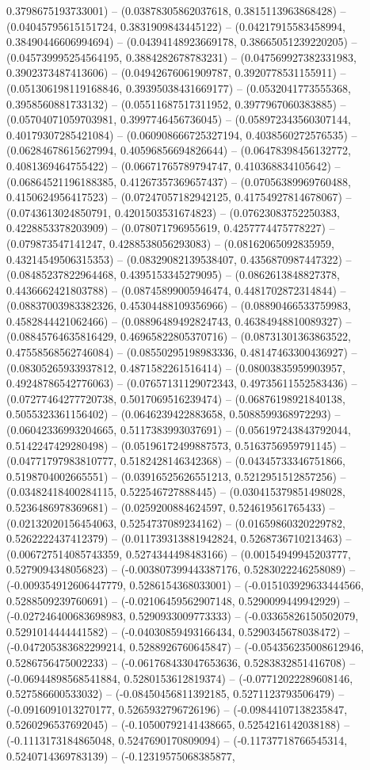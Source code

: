 0.3798675193733001) -- (0.03878305862037618, 0.3815113963868428) -- (0.04045795615151724, 0.3831909843445122) -- (0.04217915583458994, 0.38490446606994694) -- (0.04394148923669178, 0.38665051239220205) -- (0.045739995254564195, 0.3884282678783231) -- (0.047569927382331983, 0.3902373487413606) -- (0.04942676061909787, 0.3920778531155911) -- (0.051306198119168846, 0.39395038431669177) -- (0.0532041773555368, 0.3958560881733132) -- (0.05511687517311952, 0.3977967060383885) -- (0.05704071059703981, 0.3997746456736045) -- (0.058972343560307144, 0.40179307285421084) -- (0.060908666725327194, 0.4038560272576535) -- (0.06284678615627994, 0.40596856694826644) -- (0.06478398456132772, 0.4081369464755422) -- (0.06671765789794747, 0.410368834105642) -- (0.06864521196188385, 0.41267357369657437) -- (0.07056389969760488, 0.4150624956417523) -- (0.07247057182942125, 0.41754927814678067) -- (0.0743613024850791, 0.4201503531674823) -- (0.07623083752250383, 0.4228853378203909) -- (0.078071796955619, 0.4257774475778227) -- (0.079873547141247, 0.4288538056293083) -- (0.08162065092835959, 0.43214549506315353) -- (0.08329082139538407, 0.4356870987447322) -- (0.08485237822964468, 0.4395153345279095) -- (0.0862613848827378, 0.4436662421803788) -- (0.08745899005946474, 0.4481702872314844) -- (0.08837003983382326, 0.45304488109356966) -- (0.08890466533759983, 0.4582844421062466) -- (0.08896489492824743, 0.46384948810089327) -- (0.08845764635816429, 0.46965822805370716) -- (0.08731301363863522, 0.47558568562746084) -- (0.08550295198983336, 0.48147463300436927) -- (0.08305265933937812, 0.4871582261516414) -- (0.08003835959903957, 0.49248786542776063) -- (0.07657131129072343, 0.49735611552583436) -- (0.07277464277720738, 0.5017069516239474) -- (0.06876198921840138, 0.5055323361156402) -- (0.0646239422883658, 0.5088599368972293) -- (0.06042336993204665, 0.5117383993037691) -- (0.056197243843792044, 0.5142247429280498) -- (0.05196172499887573, 0.5163756959791145) -- (0.04771797983810777, 0.5182428146342368) -- (0.04345733346751866, 0.5198704002665551) -- (0.03916525626551213, 0.5212951512857256) -- (0.03482418400284115, 0.522546727888445) -- (0.030415379851498028, 0.5236486978369681) -- (0.0259200884624597, 0.524619561765433) -- (0.02132020156454063, 0.5254737089234162) -- (0.01659860320229782, 0.5262222437412379) -- (0.011739313881942824, 0.5268736710213463) -- (0.006727514085743359, 0.5274344498483166) -- (0.00154949945203777, 0.5279094348056823) -- (-0.003807399443387176, 0.5283022246258089) -- (-0.009354912606447779, 0.5286154368033001) -- (-0.015103929633444566, 0.5288509239760691) -- (-0.02106459562907148, 0.5290099449942929) -- (-0.027246400683698983, 0.5290933009773333) -- (-0.03365826150502079, 0.5291014444441582) -- (-0.04030859493166434, 0.5290345678038472) -- (-0.047205383682299214, 0.5288926760645847) -- (-0.054356235008612946, 0.5286756475002233) -- (-0.061768433047653636, 0.5283832851416708) -- (-0.06944898568541884, 0.5280153612819374) -- (-0.07712022289608146, 0.527586600533032) -- (-0.08450456811392185, 0.5271123793506479) -- (-0.0916091013270177, 0.5265932796726196) -- (-0.09844107138235847, 0.5260296537692045) -- (-0.10500792141438665, 0.5254216142038188) -- (-0.1113173184865048, 0.5247690170809094) -- (-0.11737718766545314, 0.5240714369783139) -- (-0.12319575068385877, 
